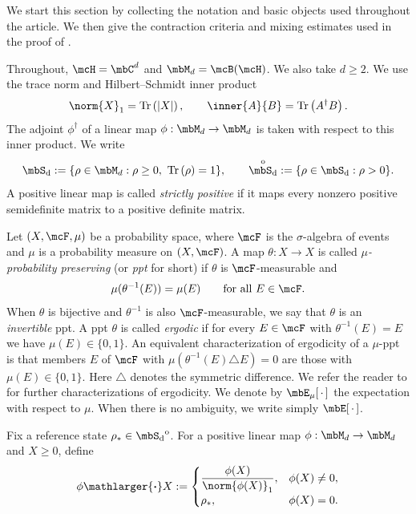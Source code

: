 \documentclass[a4paper]{article}
\numberwithin{equation}{section}   %
\theoremstyle{plain}   %
\theoremstyle{plain}   %
\theoremstyle{examplestyle}
\DeclareMathOperator{\states}{\mbS_d}   %
\newcommand{\adj}{^\dagger}         %
\renewcommand{\tr}[1]{\operatorname{Tr}\left(#1\right)} %
\newcommand{\proj}{{\mathlarger{\boldsymbol{\cdot}}}} %
\begin{document}
    We start this section by collecting the notation and basic objects used throughout the article.
    We then give the contraction criteria and mixing estimates used in the proof of .

    Throughout, \(\mcH=\mbC^d\) and \(\mbM_d=\mcB(\mcH)\).
    We also take $d\ge 2$. 
    We use the trace norm and Hilbert--Schmidt inner product
    \[
        \norm{X}_1=\tr{|X|},
        \qquad
        \inner{A}{B}=\tr{A^\dagger B}.
    \]
    The adjoint \(\phi\adj\) of a linear map \(\phi:\mbM_d\to\mbM_d\) is taken with respect to this inner product.
    We write
    \[
        \states
        :=
        \{\rho\in\mbM_d:\rho\geq0,\ \tr{\rho}=1\},
        \qquad
        \states^{\mathrm o}
        :=
        \{\rho\in\states:\rho>0\}.
    \]
    A positive linear map is called \emph{strictly positive} if it maps every nonzero positive semidefinite matrix to a positive definite matrix.

    Let $(X,\mcF,\mu)$ be a probability space, where $\mcF$ is the $\sigma$-algebra of events and $\mu$ is a probability measure on $(X,\mcF)$. 
    A map $\theta:X\to X$ is called \emph{$\mu$-probability preserving} (or \emph{ppt} for short) if $\theta$ is $\mcF$-measurable and
    \[
        \mu(\theta^{-1}(E)) = \mu(E)
        \qquad\text{for all }E\in\mcF.
    \]
    When $\theta$ is bijective and $\theta^{-1}$ is also $\mcF$-measurable, we say that $\theta$ is an \emph{invertible} ppt. 
    A ppt $\theta$ is called \emph{ergodic} if for every $E\in\mcF$ with $\theta^{-1}(E)=E$ we have $\mu(E)\in\{0,1\}$. 
    An equivalent characterization of ergodicity of a $\mu$-ppt is that members $E$ of $\mcF$ with $\mu(\theta^{-1}(E) \triangle E) =0 $ are those with $\mu(E) \in \{0,1\}$. 
    Here $\triangle$ denotes the symmetric difference. 
    We refer the reader to \cite{erg_walter} for further characterizations of ergodicity.
    We denote by $\mbE_\mu[\,\cdot\,]$ the expectation with respect to $\mu$. 
    When there is no ambiguity, we write simply $\mbE[\,\cdot\,]$.

    Fix a reference state \(\rho_*\in\states^{\mathrm o}\).
    For a positive linear map \(\phi:\mbM_d\to\mbM_d\) and \(X\geq0\),
    define
    \begin{equation}
    \label{eq:projective_action}
        \phi\proj X
        :=
        \begin{cases}
            \displaystyle
            \frac{\phi(X)}{\norm{\phi(X)}_1},
                & \phi(X)\neq0,\\[1.2ex]
            \rho_*,
                & \phi(X)=0.
        \end{cases}
    \end{equation}
\end{document}
